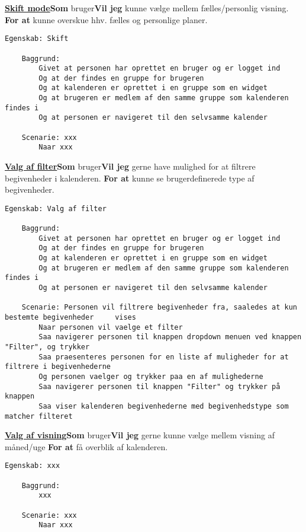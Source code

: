 \noindent \textbf{\underline{Skift mode}}\newline \textbf{Som} bruger\newline \textbf{Vil jeg} kunne vælge mellem fælles/personlig visning.
\newline \textbf{For at} kunne overskue hhv. fælles og personlige planer.

\begin{lstlisting}[language=Gherkin]
Egenskab: Skift 

    Baggrund:
        Givet at personen har oprettet en bruger og er logget ind
        Og at der findes en gruppe for brugeren
        Og at kalenderen er oprettet i en gruppe som en widget
        Og at brugeren er medlem af den samme gruppe som kalenderen findes i
        Og at personen er navigeret til den selvsamme kalender
        
    Scenarie: xxx
        Naar xxx

\end{lstlisting}

\noindent \textbf{\underline{Valg af filter}}\newline \textbf{Som} bruger\newline \textbf{Vil jeg} gerne have mulighed for at filtrere begivenheder i kalenderen.
\newline \textbf{For at} kunne se brugerdefinerede type af begivenheder.

\begin{lstlisting}[language=Gherkin]
Egenskab: Valg af filter

    Baggrund:
        Givet at personen har oprettet en bruger og er logget ind
        Og at der findes en gruppe for brugeren
        Og at kalenderen er oprettet i en gruppe som en widget
        Og at brugeren er medlem af den samme gruppe som kalenderen findes i
        Og at personen er navigeret til den selvsamme kalender 
        
    Scenarie: Personen vil filtrere begivenheder fra, saaledes at kun bestemte begivenheder     vises 
        Naar personen vil vaelge et filter
        Saa navigerer personen til knappen dropdown menuen ved knappen "Filter", og trykker
        Saa praesenteres personen for en liste af muligheder for at filtrere i begivenhederne
        Og personen vaelger og trykker paa en af mulighederne
        Saa navigerer personen til knappen "Filter" og trykker på knappen
        Saa viser kalenderen begivenhederne med begivenhedstype som matcher filteret

\end{lstlisting}

\noindent \textbf{\underline{Valg af visning}}\newline \textbf{Som} bruger\newline \textbf{Vil jeg} gerne kunne vælge mellem visning af måned/uge
\newline \textbf{For at} få overblik af kalenderen.

\begin{lstlisting}[language=Gherkin]
Egenskab: xxx

    Baggrund:
        xxx
        
    Scenarie: xxx
        Naar xxx

\end{lstlisting}